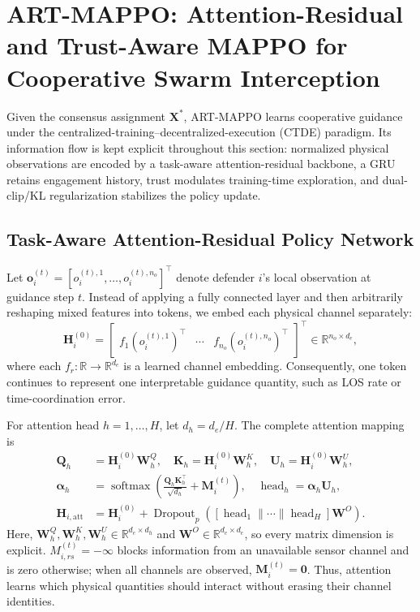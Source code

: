 \section{ART-MAPPO: Attention-Residual and Trust-Aware MAPPO for Cooperative Swarm Interception}
\label{sec:cooperative_algorithm}

Given the consensus assignment $\mathbf X^{*}$, ART-MAPPO learns cooperative guidance under
the centralized-training--decentralized-execution (CTDE) paradigm. Its information flow is
kept explicit throughout this section: normalized physical observations are encoded by a
task-aware attention-residual backbone, a GRU retains engagement history, trust modulates
training-time exploration, and dual-clip/KL regularization stabilizes the policy update.

\subsection{Task-Aware Attention-Residual Policy Network}
\label{subsec:attention_residual}

Let $\mathbf o_i^{(t)}=[o_i^{(t),1},\ldots,o_i^{(t),n_o}]^{\top}$ denote defender $i$'s
local observation at guidance step $t$. Instead of applying a fully connected layer and then
arbitrarily reshaping mixed features into tokens, we embed each physical channel separately:
\begin{equation}
\label{eq:feature_tokens}
\mathbf H_i^{(0)}=
\begin{bmatrix}
f_1(o_i^{(t),1})^{\top} & \cdots & f_{n_o}(o_i^{(t),n_o})^{\top}
\end{bmatrix}^{\top}
\in\mathbb R^{n_o\times d_e},
\end{equation}
where each $f_r:\mathbb R\rightarrow\mathbb R^{d_e}$ is a learned channel embedding.
Consequently, one token continues to represent one interpretable guidance quantity, such as
LOS rate or time-coordination error.

For attention head $h=1,\ldots,H$, let $d_h=d_e/H$. The complete attention mapping is
\begin{equation}
\label{eq:task_attention}
\begin{aligned}
\mathbf Q_h&=\mathbf H_i^{(0)}\mathbf W_h^Q,\quad
\mathbf K_h=\mathbf H_i^{(0)}\mathbf W_h^K,\quad
\mathbf U_h=\mathbf H_i^{(0)}\mathbf W_h^U,\\
\boldsymbol{\alpha}_h&=\operatorname{softmax}
\left(\frac{\mathbf Q_h\mathbf K_h^{\top}}{\sqrt{d_h}}+\mathbf M_i^{(t)}\right),
\quad \operatorname{head}_h=\boldsymbol{\alpha}_h\mathbf U_h,\\
\mathbf H_{i,\mathrm{att}}&=\mathbf H_i^{(0)}+
\operatorname{Dropout}_p\!\left(
[\operatorname{head}_1\|\cdots\|\operatorname{head}_H]\mathbf W^O\right).
\end{aligned}
\end{equation}
Here, $\mathbf W_h^Q,\mathbf W_h^K,\mathbf W_h^U\in\mathbb R^{d_e\times d_h}$ and
$\mathbf W^O\in\mathbb R^{d_e\times d_e}$, so every matrix dimension is explicit.
$M_{i,rs}^{(t)}=-\infty$ blocks information from an unavailable sensor channel and is zero
otherwise; when all channels are observed, $\mathbf M_i^{(t)}=\mathbf0$. Thus, attention
learns which physical quantities should interact without erasing their channel identities.


